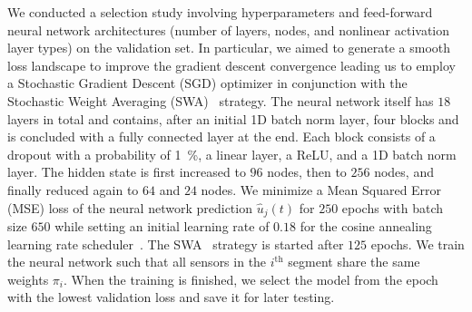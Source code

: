 We conducted a selection study involving hyperparameters and feed-forward neural network architectures (number of layers, nodes, and nonlinear activation layer types) on the validation set. %
In particular, we aimed to generate a smooth loss landscape to improve the gradient descent convergence leading us to employ a Stochastic Gradient Descent (SGD) %
optimizer in conjunction with the Stochastic Weight Averaging (SWA)~\citep{izmailov2018averaging} strategy.
The neural network itself %
has $18$ layers in total and contains, after an initial 1D batch norm layer, four blocks and is concluded with a fully connected layer at the end. Each block consists of a dropout with a probability of \SI{1}{\percent}, a linear layer, a ReLU, and a 1D batch norm layer. The hidden state is first increased to $96$ nodes, then to $256$ nodes, and finally reduced again to $64$ and $24$ nodes.
We minimize a Mean Squared Error (MSE) loss of the neural network prediction $\hat{u}_j(t)$ for $250$ epochs with batch size $650$ while setting an initial learning rate of $0.18$ for the cosine annealing learning rate scheduler~\citep{loshchilov2016sgdr}. The SWA~\citep{izmailov2018averaging} strategy is started after $125$ epochs.
We train the neural network such that all sensors in the $i^\mathrm{th}$ segment share the same weights $\pi_i$.
When the training is finished, we select the model from the epoch with the lowest validation loss and save it for later testing.

